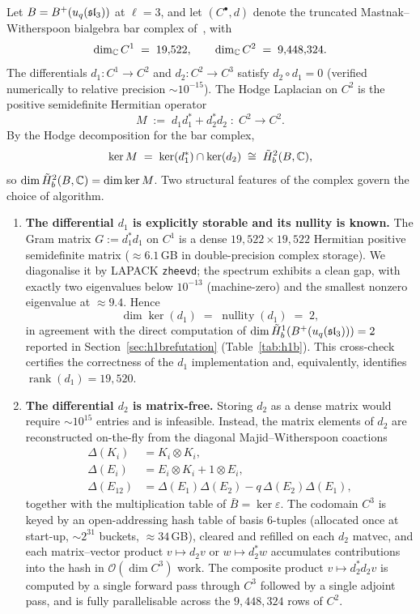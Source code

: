 Let $B = B^{+}(u_q(\mathfrak{sl}_3))$ at $\ell = 3$, and let $(C^\bullet, d)$ denote the truncated Mastnak--Witherspoon bialgebra bar complex of~\cite[\S 2.1]{MW08}, with
\[
\dim_{\mathbb{C}} C^1 \;=\; 19{,}522, \qquad \dim_{\mathbb{C}} C^2 \;=\; 9{,}448{,}324.
\]
The differentials $d_1 : C^1 \to C^2$ and $d_2 : C^2 \to C^3$ satisfy $d_2 \circ d_1 = 0$ (verified numerically to relative precision $\sim 10^{-15}$). The Hodge Laplacian on $C^2$ is the positive semidefinite Hermitian operator
\begin{equation}
\label{eq:hodge_laplacian}
M \;:=\; d_1 d_1^* + d_2^* d_2 \;:\; C^2 \longrightarrow C^2.
\end{equation}
By the Hodge decomposition for the bar complex,
\[
\ker M \;=\; \ker(d_1^*) \cap \ker(d_2) \;\cong\; \tilde{H}^2_b(B, \mathbb{C}),
\]
so $\dim \tilde{H}^2_b(B, \mathbb{C}) = \dim \ker M$. Two structural features of the complex govern the choice of algorithm.

\begin{enumerate}[label=(\roman*)]
\item \textbf{The differential $d_1$ is explicitly storable and its nullity is known.} The Gram matrix $G := d_1^* d_1$ on $C^1$ is a dense $19{,}522 \times 19{,}522$ Hermitian positive semidefinite matrix ($\approx 6.1$\,GB in double-precision complex storage). We diagonalise it by LAPACK \texttt{zheevd}; the spectrum exhibits a clean gap, with exactly two eigenvalues below $10^{-13}$ (machine-zero) and the smallest nonzero eigenvalue at $\approx 9.4$. Hence
\[
\dim \ker(d_1) \;=\; \operatorname{nullity}(d_1) \;=\; 2,
\]
in agreement with the direct computation of $\dim \tilde{H}^1_b(B^{+}(u_q(\mathfrak{sl}_3))) = 2$ reported in Section~\ref{sec:h1brefutation} (Table~\ref{tab:h1b}). This cross-check certifies the correctness of the $d_1$ implementation and, equivalently, identifies $\operatorname{rank}(d_1) = 19{,}520$.

\item \textbf{The differential $d_2$ is matrix-free.} Storing $d_2$ as a dense matrix would require $\sim 10^{15}$ entries and is infeasible. Instead, the matrix elements of $d_2$ are reconstructed on-the-fly from the diagonal Majid--Witherspoon coactions
\[
\begin{aligned}
\Delta(K_i) &= K_i \otimes K_i, \\
\Delta(E_i) &= E_i \otimes K_i + 1 \otimes E_i, \\
\Delta(E_{12}) &= \Delta(E_1)\Delta(E_2) - q\,\Delta(E_2)\Delta(E_1),
\end{aligned}
\]
together with the multiplication table of $\bar{B} = \ker \varepsilon$. The codomain $C^3$ is keyed by an open-addressing hash table of basis $6$-tuples (allocated once at start-up, $\sim 2^{31}$ buckets, $\approx 34$\,GB), cleared and refilled on each $d_2$ matvec, and each matrix--vector product $v \mapsto d_2 v$ or $w \mapsto d_2^* w$ accumulates contributions into the hash in $\mathcal{O}(\dim C^3)$ work. The composite product $v \mapsto d_2^* d_2 v$ is computed by a single forward pass through $C^3$ followed by a single adjoint pass, and is fully parallelisable across the $9{,}448{,}324$ rows of $C^2$.
\end{enumerate}

